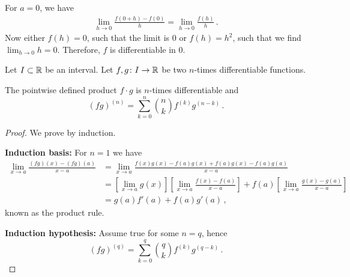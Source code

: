 \documentclass[week=6]{homework}
\begin{document}
\begin{questions}
\begin{parts}
	        For $a = 0$, we have
	        \begin{align*}
	        	\lim_{h\to 0} \frac{f(0+h)-f(0)}{h} = \lim_{h\to 0} \frac{f(h)}{h}\,.
	        \end{align*}
	        Now either $f(h) = 0$, such that the limit is $0$ or $f(h) = h^2$, such that we find $\lim_{h\to 0} h = 0$. Therefore, $f$ is differentiable in $0$.
        \end{parts}
        
        \question
        Let $I \subset \mathbb{R}$ be an interval. Let $f,g \colon I \to \mathbb{R}$ be two $n$-times differentiable functions.
        \begin{toprove}
        	The pointwise defined product $f\cdot g$ is $n$-times differentiable and
        	\[
	        	(fg)^{(n)} = \sum_{k=0}^{n} {n\choose k} f^{(k)}g^{(n-k)}\,.
        	\]
        \end{toprove}
	    \begin{proof}
	    	We prove by induction.
	    	
	    	\textbf{Induction basis:}
	    	For $n=1$ we have
	    	\begin{align*}
	    		\lim_{x\to a} \frac{(fg)(x)-(fg)(a)}{x-a} &= \lim_{x\to a} \frac{f(x)g(x)-f(a)g(x)+f(a)g(x)-f(a)g(a)}{x-a} \\
	    		&= \left[ \lim_{x\to a}g(x) \right] \left[ \lim_{x\to a} \frac{f(x)-f(a)}{x-a} \right] + f(a) \left[ \lim_{x\to a} \frac{g(x)-g(a)}{x-a} \right] \\
	    		&= g(a)f'(a)+f(a)g'(a)\,,
	    	\end{align*}
	    	known as the product rule.
	    	
	    	\textbf{Induction hypothesis:}
	    	Assume true for some $n=q$, hence
	    	\[
		    	(fg)^{(q)} = \sum_{k=0}^{q} {q\choose k} f^{(k)}g^{(q-k)}\,.
	    	\]
	    	

\end{proof}
\end{questions}
\end{document}
